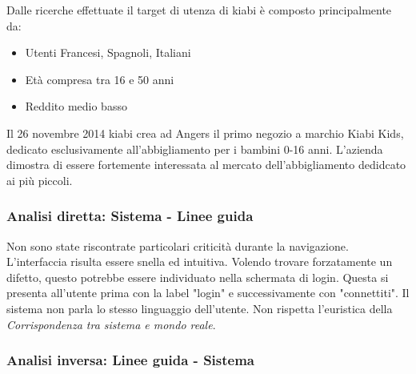 \documentclass[12pt,italian,]{report}
\begin{document}
Dalle ricerche effettuate il target di utenza di kiabi è composto principalmente da:
\begin{itemize}
    \item Utenti Francesi, Spagnoli, Italiani
    \item Età compresa tra 16 e 50 anni
    \item Reddito medio basso
\end{itemize}

Il 26 novembre 2014 kiabi crea ad Angers il primo negozio a marchio Kiabi Kids, dedicato esclusivamente all'abbigliamento per i bambini 0-16 anni. L'azienda dimostra di essere fortemente interessata al mercato dell'abbigliamento dedidcato ai più piccoli.



\subsubsection{Analisi diretta: Sistema - Linee
guida}\label{analisi-diretta-sistema---linee-guida}


Non sono state riscontrate particolari criticità durante la navigazione. L'interfaccia risulta essere snella ed intuitiva. Volendo trovare forzatamente un difetto, questo potrebbe essere individuato nella schermata di login. Questa si presenta all'utente prima con la label "login" e successivamente con "connettiti". Il sistema non parla lo stesso linguaggio dell'utente. Non rispetta l'euristica della \emph{Corrispondenza tra sistema e mondo reale}.



\hypertarget{analisi-inversa-linee-guida---sistema}{%
\subsubsection{Analisi inversa: Linee guida -
Sistema}\label{analisi-inversa-linee-guida---sistema}}
\end{document}
